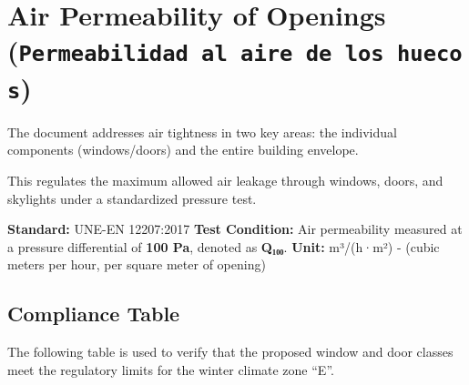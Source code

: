 \documentclass[
  10pt,
  letterpaper,
]{scrbook}
\begin{document}

\chapter{\texorpdfstring{Air Permeability of Openings
(\texttt{Permeabilidad\ al\ aire\ de\ los\ huecos})}{Air Permeability of Openings (Permeabilidad al aire de los huecos)}}\label{air-permeability-of-openings-permeabilidad-al-aire-de-los-huecos}

The document addresses air tightness in two key areas: the individual
components (windows/doors) and the entire building envelope.

This regulates the maximum allowed air leakage through windows, doors,
and skylights under a standardized pressure test.

\textbf{Standard:} UNE-EN 12207:2017 \textbf{Test Condition:} Air
permeability measured at a pressure differential of \textbf{100 Pa},
denoted as \textbf{Q₁₀₀}. \textbf{Unit:} m³/(h·m²) - (cubic meters per
hour, per square meter of opening)

\section{Compliance Table}\label{compliance-table}

The following table is used to verify that the proposed window and door
classes meet the regulatory limits for the winter climate zone ``E''.
\end{document}
